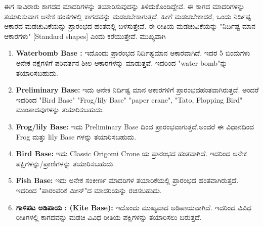  ಈಗ ಸಾವಿರಾರು ಕಾಗದದ ಮಾದರಿಗಳನ್ನು ತಯಾರಿಸುವುದನ್ನು ತಿಳಿದುಕೊಂಡಿದ್ದೇವೆ. ಈ ಕಾಗದ ಮಾದರಿಗಳನ್ನು ತಯಾರಿಸುವಾಗ ಅನೇಕ ಹಂತಗಳಲ್ಲಿ ಕಾಗದವನ್ನು ಮಡಚಬೇಕಾಗುತ್ತದೆ. ಹೀಗೆ ಮಡಚಬೇಕಾದರೆ, ಒಂದು ನಿರ್ದಿಷ್ಟ ಆಕಾರದ ಮಡಚುವಿಕೆಯನ್ನು ಪ್ರಾರಂಭದ ಹಂತದಲ್ಲಿ ಬಳಸುತ್ತೇವೆ. ಈ ರೀತಿಯ ಮಡಚುವಿಕೆಯನ್ನು "ನಿರ್ದಿಷ್ಟ ಮಾನ ಆಕಾರಗಳು" [Standard shapes] ಎಂದು ಕರೆಯುತ್ತೇವೆ. ಮುಖ್ಯವಾಗಿ 
 \begin{enumerate}
  \item[{\bf [a]}] \textbf{Waterbomb Base :} ಇದೊಂದು ಪ್ರಾರಂಭದ ನಿರ್ದಿಷ್ಟಮಾನ ಆಕಾರ\-ವಾಗಿದೆ. ಇದರ 5 ಬಿಂದುಗಳು ಅನೇಕ ನಕ್ಷೆಗಳಿಗೆ ಪರಿವರ್ತನ ಶೀಲ ಆಕಾರಗಳನ್ನು ಮಾಡುತ್ತವೆ. ಇದರಿಂದ "water bomb"ನ್ನು ತಯಾರಿಸಬಹುದು.

\medskip
  
  \item[{\bf [b]}] \textbf{Preliminary Base:} ಇದು ಅನೇಕ ನಿರ್ದಿಷ್ಟ ಮಾನ ಆಕಾರಗಳಿಗೆ ಪ್ರಾರಂಭದ\break ಹಂತವಾಗಿರುತ್ತದೆ. ಅಂದರೆ ಇದರಿಂದ "Bird Base" "Frog/lily Base" "paper crane", "Tato, Flopping Bird"  ಮುಂತಾದವುಗಳನ್ನು ತಯಾರಿಸಬಹುದು.  

\medskip
  
  \item[{\bf [c]}] \textbf{Frog/lily Base:} ಇದು Preliminary Base ದಿಂದ ಪ್ರಾರಂಭವಾಗುತ್ತದೆ.\break ಅಂದರೆ ಈ ವಿಧಾನದಿಂದ Frog ಮತ್ತು lily Base ಗಳನ್ನು ತಯಾರಿಸಬಹುದು.

\medskip
   
  \item[{\bf [d]}] \textbf{Bird  Base:} ಇದು Classic Origomi Crone ಯ ಪ್ರಾರಂಭದ ಹಂತವಾಗಿದೆ. ಇದರಿಂದ ಅನೇಕ ಪಕ್ಷಿಗಳನ್ನು/ಪ್ರಾಣಿಗಳನ್ನು ತಯಾರಿಸಬಹುದು. 


  \medskip
  
  \item[{\bf [e]}] \textbf{Fish Base:}  ಇದು ಅನೇಕ ಸಂಕೀರ್ಣ ಮಾದರಿಗಳ ತಯಾರಿಕೆಯಲ್ಲಿ ಪ್ರಾರಂಭದ ಹಂತವಾಗಿರುತ್ತದೆ. ಇದರಿಂದ "ಪಾರಂಪರಿಕ ಮೀನ್"ದ ಮಾದರಿಯನ್ನು ರಚಿಸಬಹುದು.
  
  \medskip
  
  \item[{\bf [f]}] \textbf{ಗಾಳಿಪಟ ಅಡಿಪಾಯ : (Kite Base):} ಇದೊಂದು ಮುಖ್ಯವಾದ ಅಡಿಪಾಯವಾಗಿದೆ. ಇದರಿಂದ ವಿವಿಧ ರೀತಿಗಳಲ್ಲಿ ಕಾಗದವನ್ನು ಮಡಚಿ ವಿವಿಧ ರೀತಿಯ ಪಕ್ಷಿಗಳನ್ನು ತಯಾರಿಸಲು ಬರುತ್ತದೆ. 
\end{enumerate}

